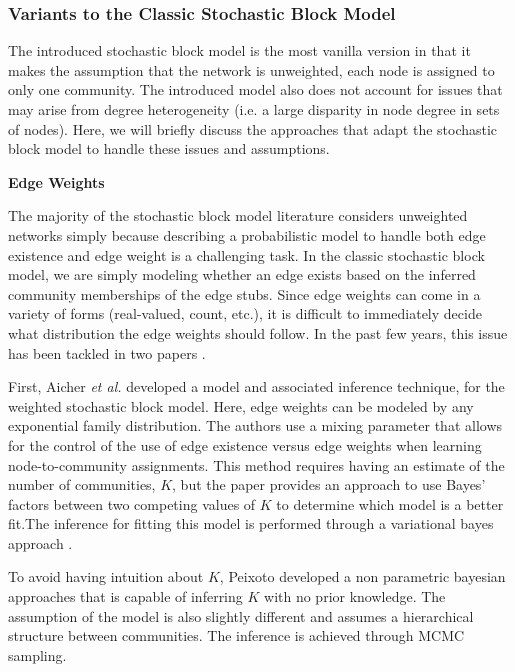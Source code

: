 \subsubsection{Variants to the Classic Stochastic Block Model}

The introduced stochastic block model is the most vanilla version in that it makes the assumption that the network is unweighted, each node is assigned to only one community. The introduced model also does not account for issues that may arise from degree heterogeneity (i.e. a large disparity in node degree in sets of nodes).  Here, we will briefly discuss the approaches that adapt the stochastic block model to handle these issues and assumptions. 

{\bf Edge Weights}

\indent The majority of the stochastic block model literature considers unweighted networks simply because describing a probabilistic model to handle both edge existence and edge weight is a challenging task. In the classic stochastic block model, we are simply modeling whether an edge exists based on the inferred community memberships of the edge stubs. Since edge weights can come in a variety of forms (real-valued, count, etc.), it is difficult to immediately decide what distribution the edge weights should follow. In the past few years, this issue has been tackled in two papers \cite{aicher,peix}.

\indent First, Aicher \emph{et al.} developed a model and associated inference technique, for the weighted stochastic block model. Here, edge weights can be modeled by any exponential family distribution. The authors use a mixing parameter that allows for the control of the use of edge existence versus edge weights when learning node-to-community assignments. This method requires having an estimate of the number of communities, $K$, but the paper provides an approach to use Bayes' factors between two competing values of $K$ to determine which model is a better fit.The inference for fitting this model is performed through a variational bayes approach \cite{vBayes}.

\indent To avoid having intuition about $K$, Peixoto \cite{peix} developed a non parametric bayesian approaches that is capable of inferring $K$ with no prior knowledge. The assumption of the model is also slightly different and assumes a hierarchical structure between communities. The inference is achieved through MCMC sampling. 

